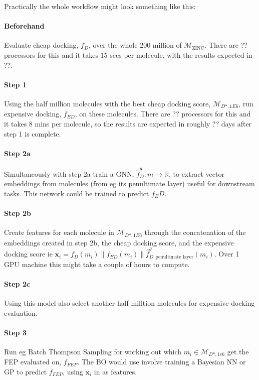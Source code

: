 \documentclass{article}
\begin{document}
\noindent
Practically the whole workflow might look something like this:
\paragraph{Beforehand} Evaluate cheap docking, $f_D$, over the whole 200 million of $\mathcal{M}_{\textrm{ZINC}}$. 
There are ?? processors for this and it takes 15 secs per molecule, with the results expected in ??.
\paragraph{Step 1} Using the half million molecules with the best cheap docking score, $\mathcal{M}_{D\ast,1E6}$, run
expensive docking, $f_{ED}$, on these molecules. There are ?? processors for this and it takes 8 mins per molecule, so the
results are expected in roughly ?? days after step 1 is complete.
\paragraph{Step 2a} 
Simultaneously with step 2a train a GNN, $\hat{f}_D^\theta: m \to \mathbb{R}$,
to extract vector embeddings from molecules (from eg its penultimate layer) useful for downstream tasks.
This network could be trained to predict $f_ED$. 
\paragraph{Step 2b} Create features for each molecule in $\mathcal{M}_{D\ast,1E6}$ through the concatenation
of the embeddings created in step 2b, the cheap docking score, and the expensive docking score ie
$\bm{x}_i = f_D(m_i) \| f_{ED}(m_i) \| \hat{f}_{D, \textrm{penultimate layer}}^\theta(m_i) $.
Over 1 GPU machine this might take a couple of hours to compute.
\paragraph{Step 2c} Using this model also select another half milltion molecules for expensive docking evaluation.
\paragraph{Step 3} Run eg Batch Thompson Sampling \citep{pmlr-v70-hernandez-lobato17a} for working out which
$m_i \in \mathcal{M}_{D\ast,1e6}$ get the FEP evaluated on, $f_{FEP}$. 
The BO would use involve training a Bayesian NN or GP to predict $f_{FEP}$, using $\bm{x}_i$ in as features.
\end{document}
